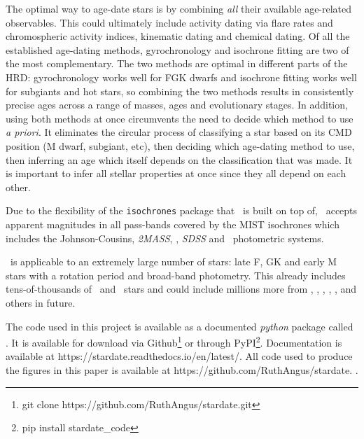 The optimal way to age-date stars is by combining {\it all} their available
age-related observables.
This could ultimately include activity dating via flare rates and
chromospheric activity indices, kinematic dating and chemical dating.
Of all the established age-dating methods, gyrochronology and isochrone
fitting are two of the most complementary.
The two methods are optimal in different parts of the HRD:
gyrochronology works well for FGK dwarfs and isochrone fitting works well for
subgiants and hot stars, so combining the two methods results in consistently
precise ages across a range of masses, ages and evolutionary stages.
In addition, using both methods at once circumvents the need to decide which
method to use {\it a priori}.
It eliminates the circular process of classifying a star based on its CMD
position (M dwarf, subgiant, etc), then deciding which age-dating method to
use, then inferring an age which itself depends on the classification that was
made.
It is important to infer all stellar properties at once since they all depend
on each other.

Due to the flexibility of the {\tt isochrones} package that \sd\ is built on
top of, \sd\ accepts apparent magnitudes in all pass-bands covered by the MIST
isochrones which includes the Johnson-Cousins, {\it 2MASS}, \Kepler, {\it
SDSS} and \Gaia\ photometric systems.

\sd\ is applicable to an extremely large number of stars: late F, GK and early
M stars with a rotation period and broad-band photometry.
This already includes tens-of-thousands of \kepler\ and \ktwo\ stars and could
include millions more from \tess, \lsst, \wfirst, \plato, \gaia, and others in
future.

The code used in this project is available as a documented {\it python}
package called \sd.
It is available for download via Github\footnote{git clone
https://github.com/RuthAngus/stardate.git} or through
PyPI\footnote{pip install stardate\_code}.
Documentation is available at https://stardate.readthedocs.io/en/latest/.
All code used to produce the figures in this paper is available at
https://github.com/RuthAngus/stardate.
.
